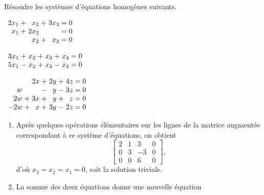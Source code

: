 \newpage

\begin{exercice}
  Résoudre les systèmes d'équations homogènes suivants.
  \begin{enumerate}
    \begin{multicols}{2}
    \item $%
      \begin{array}[t]{*{2}{r@{\;}c@{\;}}r@{\;=\;}r}
        2x_1 &+&  x_2 &+& 3x_3 & 0 \\
        x_1 &+& 2x_2 & &      & 0 \\
        & &  x_2 &+&  x_3 & 0
      \end{array}$
    \item $%
      \begin{array}[t]{*{3}{r@{\;}c@{\;}}r@{\;=\;}r}
        3x_1 &+&   x_2 &+&  x_3 &+&  x_4 & 0 \\
        5x_1 &-&   x_2 &+&  x_3 &-&  x_4 & 0
      \end{array}$
    \end{multicols}
    \begin{multicols}{2}
    \item $%
      \begin{array}[t]{*{3}{r@{\;}c@{\;}}r@{\;=\;}r}
        & & 2x &+& 2y &+& 4z & 0 \\
        w & &    &-&  y &-& 3z & 0 \\
        2w &+& 3x &+&  y &+&  z & 0 \\
        -2w &+&  x &+& 3y &-& 2z & 0
      \end{array}$
    \end{multicols}
  \end{enumerate}
  \begin{sol}
    \begin{enumerate}
    \item Après quelques opérations élémentaires sur les lignes de la
      matrice augmentée correspondant à ce système d'équations, on
      obtient
      \begin{displaymath}
        \begin{bmatrix}
          2 & 1 &  3 & 0 \\
          0 & 3 & -3 & 0 \\
          0 & 0 &  6 & 0
        \end{bmatrix},
      \end{displaymath}
      d'où $x_3 = x_2 = x_1 = 0$, soit la solution triviale.
    \item La somme des deux équations donne une nouvelle équation

\end{enumerate}
\end{sol}
\end{exercice}
